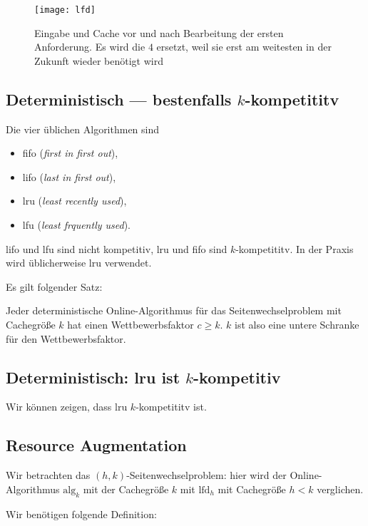 \begin{figure}[H]
  \texttt{[image: lfd]}
  \caption{Eingabe und Cache vor und nach Bearbeitung der ersten Anforderung. Es wird die \( 4 \) ersetzt, weil sie erst am weitesten in der Zukunft wieder benötigt wird}
\end{figure}

\subsection{Deterministisch --- bestenfalls \( k \)-kompetititv}

Die vier üblichen Algorithmen sind
\begin{itemize}
  \item fifo (\emph{first in first out}),
  \item lifo (\emph{last in first out}),
  \item lru (\emph{least recently used}),
  \item lfu (\emph{least frquently used}).
\end{itemize}

lifo und lfu sind nicht kompetitiv, lru und fifo sind \( k \)-kompetititv. In der Praxis wird üblicherweise lru verwendet.

Es gilt folgender Satz:

\begin{theorem}
  Jeder deterministische Online-Algorithmus für das Seitenwechselproblem mit Cachegröße \( k \) hat einen Wettbewerbsfaktor \( c \geq k \). \( k \) ist also eine untere Schranke für den Wettbewerbsfaktor.
\end{theorem}

\subsection{Deterministisch: lru ist \( k \)-kompetitiv}

Wir können zeigen, dass lru \( k \)-kompetititv ist.

\subsection{Resource Augmentation}

Wir betrachten das \( (h,k) \)-Seitenwechselproblem: hier wird der Online-Algorithmus \( \text{alg}_k \) mit der Cachegröße \( k \) mit \( \text{lfd}_h \) mit Cachegröße \( h < k \) verglichen.

Wir benötigen folgende Definition:

